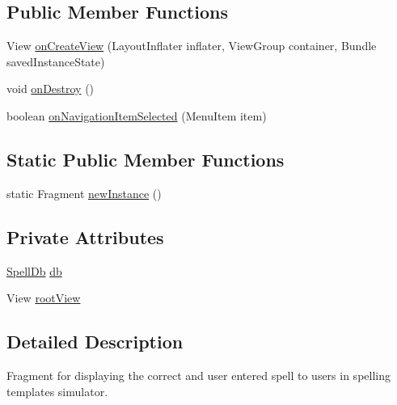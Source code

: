\subsection*{Public Member Functions}
\begin{DoxyCompactItemize}
\item 
View \hyperlink{classorg_1_1buildmlearn_1_1toolkit_1_1learnspelling_1_1fragment_1_1ResponseFragment_aeba9c2e5f8437768c9c00c641f8cbfb9}{on\+Create\+View} (Layout\+Inflater inflater, View\+Group container, Bundle saved\+Instance\+State)
\item 
void \hyperlink{classorg_1_1buildmlearn_1_1toolkit_1_1learnspelling_1_1fragment_1_1ResponseFragment_a40183995e317e53d182dee0c1eaf81c6}{on\+Destroy} ()
\item 
boolean \hyperlink{classorg_1_1buildmlearn_1_1toolkit_1_1learnspelling_1_1fragment_1_1ResponseFragment_a926dfef96837a1d22bc2a84060d719d1}{on\+Navigation\+Item\+Selected} (Menu\+Item item)
\end{DoxyCompactItemize}
\subsection*{Static Public Member Functions}
\begin{DoxyCompactItemize}
\item 
static Fragment \hyperlink{classorg_1_1buildmlearn_1_1toolkit_1_1learnspelling_1_1fragment_1_1ResponseFragment_ae8fd6b8c531cb99ae2b0f8b90de94821}{new\+Instance} ()
\end{DoxyCompactItemize}
\subsection*{Private Attributes}
\begin{DoxyCompactItemize}
\item 
\hyperlink{classorg_1_1buildmlearn_1_1toolkit_1_1learnspelling_1_1data_1_1SpellDb}{Spell\+Db} \hyperlink{classorg_1_1buildmlearn_1_1toolkit_1_1learnspelling_1_1fragment_1_1ResponseFragment_af93cfb1dc3de3bd19aa6a5fbb7515c5a}{db}
\item 
View \hyperlink{classorg_1_1buildmlearn_1_1toolkit_1_1learnspelling_1_1fragment_1_1ResponseFragment_a98db4a1cbd80c50e4bc1c4df98c1b9a0}{root\+View}
\end{DoxyCompactItemize}


\subsection{Detailed Description}
Fragment for displaying the correct and user entered spell to users in spelling template\textquotesingle{}s simulator. 

